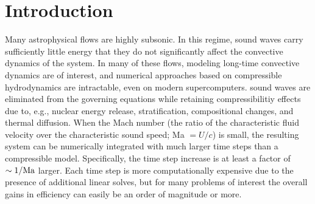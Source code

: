 \section{Introduction} \label{sec:intro}
Many astrophysical flows are highly subsonic.  In this regime,
sound waves carry sufficiently little energy that they do not
significantly affect the convective dynamics of the system.  In many
of these flows, modeling long-time convective dynamics are of
interest, and numerical approaches based on compressible hydrodynamics
are intractable, even on modern supercomputers.   
sound waves are eliminated from the governing equations
while retaining compressibilitiy effects due to, e.g., nuclear energy
release, stratification, compositional changes, and thermal diffusion.
When the Mach number (the ratio of the characteristic fluid velocity over the
characteristic sound speed; Ma $= U/c$) is small, the resulting system
can be numerically integrated with much larger time steps than a
compressible model.  Specifically, the time step increase is at least
a factor of $\sim 1/{\rm Ma}$ larger.  Each time step is more
computationally expensive due to the presence of additional linear
solves, but for many problems of interest the overall gains in
efficiency can easily be an order of magnitude or more.


